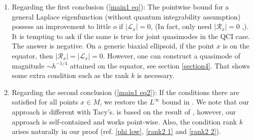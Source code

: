 \documentclass[12pt,reqno]{amsart}
\newtheorem{maintheo}{{\sc Theorem}}
\numberwithin{equation}{section}
\newenvironment{rem}{\medskip\noindent{\it Remark:\/} }{\medskip}
\begin{document}
\begin{rem}
   \begin{enumerate}
       \item Regarding the first conclusion (\ref{main1 eq}): The pointwise bound for a general Laplace eigenfunction (without quantum integrability assumption) possess an improvement to little $o$ if $|\mathcal{L}_x|=0$, \cite{SZ02} (In fact, only need $|\mathcal{R}_x|=0$ ,\cite{STZ11}). It is tempting to ask if the same is true for joint quasimodes in the QCI case. The answer is negative. On a generic biaxial ellipsoid, if the point $x$ is on the equator, then $|\mathcal{R}_x|=|\mathcal{L}_x|=0$. However, one can construct a quasimode of magnitude $\sim  h^{-1/4}$ attained on the equator, see section \ref{section4}. That shows some extra condition such as the rank $k$ is necessary.
       \item Regarding the second conclusion (\ref{main1 eq2}): If the conditions there are satisfied for all points $x\in M$, we restore the $L^{\infty}$ bound in \cite{Tacy19}. We note that our approach is different with Tacy's. \cite{Tacy19} is based on the result of \cite{KTZ}, however, our approach is self-contained and works point-wise. Also, the condition rank $k$ arises naturally in our proof (ref. \eqref{phi low}, \eqref{rank2 1} and \eqref{rank2 2}).
   \end{enumerate}
\end{rem}


\end{document}
